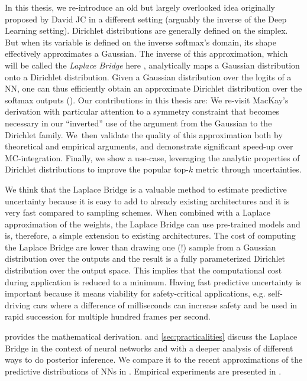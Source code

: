 In this thesis, we re-introduce an old but largely overlooked idea originally proposed by David JC \citet{MacKay1998} in a different setting (arguably the inverse of the Deep Learning setting). Dirichlet distributions are generally defined on the simplex. But when its variable is defined on the inverse softmax's domain, its shape effectively approximates a Gaussian. The inverse of this approximation, which will be called the \emph{Laplace Bridge} here \citep{KernelTopicModels2012}, analytically maps a Gaussian distribution onto a Dirichlet distribution. Given a Gaussian distribution over the logits of a NN, one can thus efficiently obtain an approximate Dirichlet distribution over the softmax outputs (). Our contributions in this thesis are: We re-visit MacKay's derivation with particular attention to a symmetry constraint that becomes necessary in our ``inverted'' use of the argument from the Gaussian to the Dirichlet family. We then validate the quality of this approximation both by theoretical and empirical arguments, and demonstrate significant speed-up over MC-integration. Finally, we show a use-case, leveraging the analytic properties of Dirichlet distributions to improve the popular top-$k$ metric through uncertainties.

We think that the Laplace Bridge is a valuable method to estimate predictive uncertainty because it is easy to add to already existing architectures and it is very fast compared to sampling schemes. When combined with a Laplace approximation of the weights, the Laplace Bridge can use pre-trained models and is, therefore, a simple extension to existing architectures. The cost of computing the Laplace Bridge are lower than drawing one (!) sample from a Gaussian distribution over the outputs and the result is a fully parameterized Dirichlet distribution over the output space. This implies that the computational cost during application is reduced to a minimum. Having fast predictive uncertainty is important because it means viability for safety-critical applications, e.g. self-driving cars where a difference of milliseconds can increase safety and be used in rapid succession for multiple hundred frames per second. 

 provides the mathematical derivation.  and \ref{sec:practicalities} discuss the Laplace Bridge in the context of neural networks and with a deeper analysis of different ways to do posterior inference. We compare it to the recent approximations of the predictive distributions of NNs in . Empirical experiments are presented in .
